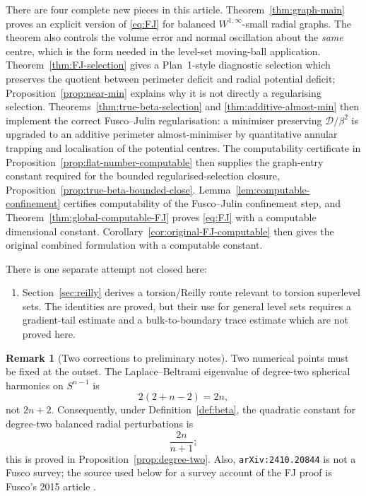 \documentclass[11pt]{amsart}
\theoremstyle{definition}
\newtheorem{remark}[theorem]{Remark}
\newcommand{\Def}{\mathcal D}
\begin{document}
There are four complete new pieces in this article.
Theorem~\ref{thm:graph-main} proves an explicit version of
\eqref{eq:FJ} for balanced \(W^{1,\infty}\)-small radial graphs.  The theorem
also controls the volume error and normal oscillation about the \emph{same}
centre, which is the form needed in the level-set moving-ball application.
Theorem~\ref{thm:FJ-selection} gives a Plan~1-style diagnostic selection
which preserves the quotient between perimeter deficit and radial potential
deficit; Proposition~\ref{prop:near-min} explains why it is not directly a
regularising selection.  Theorems~\ref{thm:true-beta-selection} and
\ref{thm:additive-almost-min} then implement the correct Fusco--Julin
regularisation: a minimiser preserving \(\Def/\beta^2\) is upgraded to an
additive perimeter almost-minimiser by quantitative annular trapping and
localisation of the potential centres.
The computability certificate in
Proposition~\ref{prop:flat-number-computable} then supplies the graph-entry
constant required for the bounded regularised-selection closure,
Proposition~\ref{prop:true-beta-bounded-close}.
Lemma~\ref{lem:computable-confinement} certifies computability of the
Fusco--Julin confinement step, and
Theorem~\ref{thm:global-computable-FJ} proves \eqref{eq:FJ} with a
computable dimensional constant.  Corollary~\ref{cor:original-FJ-computable}
then gives the original combined formulation with a computable constant.

There is one separate attempt not closed here:
\begin{enumerate}[label=\textnormal{(\roman*)},leftmargin=2.2em]
\item Section~\ref{sec:reilly} derives a torsion/Reilly route relevant to
torsion superlevel sets.  The identities are proved, but their use for general
level sets requires a gradient-tail estimate and a bulk-to-boundary trace
estimate which are not proved here.
\end{enumerate}

\begin{remark}[Two corrections to preliminary notes]\label{rem:corrections}
Two numerical points must be fixed at the outset.  The Laplace--Beltrami
eigenvalue of degree-two spherical harmonics on \(S^{n-1}\) is
\[
   2(2+n-2)=2n,
\]
not \(2n+2\).  Consequently, under Definition~\ref{def:beta}, the quadratic
constant for degree-two balanced radial perturbations is
\[
   \frac{2n}{n+1};
\]
this is proved in Proposition~\ref{prop:degree-two}.  Also,
\texttt{arXiv:2410.20844} is not a Fusco survey; the source used below for a
survey account of the FJ proof is Fusco's 2015 article
\cite{FuscoSurvey}.
\end{remark}
\end{document}
